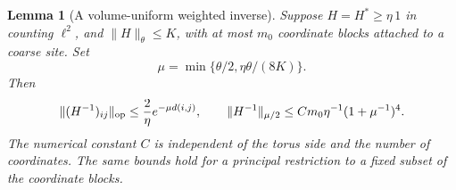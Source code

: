 \documentclass[11pt,reqno]{amsart}
\numberwithin{equation}{section}
\newtheorem{lemma}[theorem]{Lemma}
\theoremstyle{definition}
\theoremstyle{remark}
\begin{document}
\begin{lemma}[A volume-uniform weighted inverse]
\label{lem:uniform-inverse}
Suppose \(H=H^*\ge\eta\,1\) in counting \(\ell^2\), and
\(\|H\|_\theta\le K\), with at most \(m_0\) coordinate blocks
attached to a coarse site. Set
\begin{equation}
               \mu=\min\{\theta/2,\eta\theta/(8K)\}.
 \label{eq:inverse-rate}
\end{equation}
Then
\begin{equation}
       \|(H^{-1})_{ij}\|_{\rm op}\le\frac2\eta e^{-\mu d(i,j)},
       \qquad
       \|H^{-1}\|_{\mu/2}
              \le C m_0\eta^{-1}(1+\mu^{-1})^4.
 \label{eq:proved-weighted-inverse}
\end{equation}
The numerical constant \(C\) is independent of the torus side
and the number of coordinates. The same bounds hold for a
principal restriction to a fixed subset of the coordinate blocks.
\end{lemma}
\end{document}
